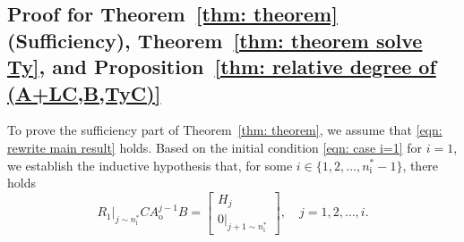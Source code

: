 \documentclass[sort&compress]{elsarticle}
\newcommand\Ao{A_\mathrm o}
\newcommand\nsharp{n_\mathrm i^*}
\begin{document}
\subsection{Proof for Theorem~\ref{thm: theorem} (Sufficiency),
Theorem~\ref{thm: theorem solve Ty}, and
Proposition~\ref{thm: relative degree of (A+LC,B,TyC)}}

To prove the sufficiency part of Theorem~\ref{thm: theorem},
we assume that \eqref{eqn: rewrite main result} holds.
Based on the initial condition \eqref{eqn: case i=1} for $i=1$,
we establish the inductive hypothesis that,
for some $i \in \{1, 2, \dots, \nsharp-1\}$, there holds
\begin{equation}\label{eqn: sufficiency inductive hypothesis}
R_1|_{j\sim\nsharp} C \Ao^{j-1} B
= \begin{bmatrix} H_j \\ 0|_{j+1\sim\nsharp} \end{bmatrix},
\quad j = 1, 2, \dots, i.
\end{equation}
\end{document}
